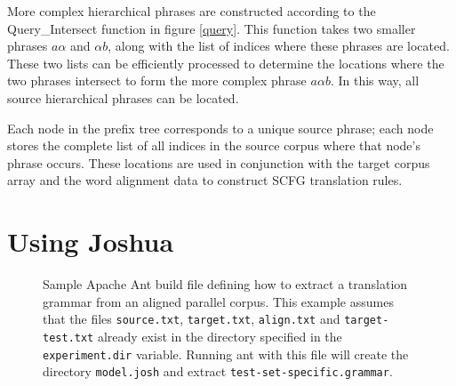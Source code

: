 \documentclass{pbml}
\begin{document}
More complex hierarchical phrases are constructed according to the {\sc Query\_Intersect} function in figure \ref{query}. This function takes two smaller phrases $a\alpha$ and $\alpha{}b$, along with the list of indices where these phrases are located. These two lists can be efficiently processed to determine the locations where the two phrases intersect to form the more complex phrase $a\alpha{}b$. In this way, all source hierarchical phrases can be located.

Each node in the prefix tree corresponds to a unique source phrase; each node stores the complete list of all indices in the source corpus where that node's phrase occurs. These locations are used in conjunction with the target corpus array and the word alignment data to construct SCFG translation rules.



\section{Using Joshua}
\label{using-joshua}

\begin{figure}
\caption{Sample Apache Ant build file defining how to extract a translation grammar from an aligned parallel corpus. This example assumes that the files {\tt source.txt}, {\tt target.txt}, {\tt align.txt} and {\tt target-test.txt} already exist in the directory specified in the {\tt experiment.dir} variable. Running ant with this file will create the directory {\tt model.josh} and extract {\tt test-set-specific.grammar}.}
\end{figure}
\end{document}

